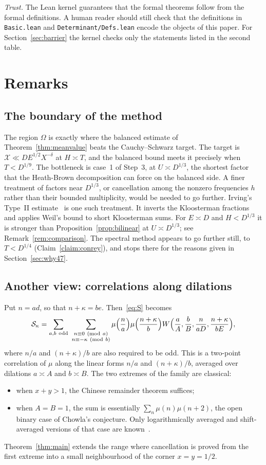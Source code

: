 \documentclass[11pt]{amsart}
\theoremstyle{definition}
\theoremstyle{remark}
\numberwithin{equation}{section}
\newcommand{\cS}{\mathcal S}
\newcommand{\cX}{\mathcal X}
\begin{document}
\emph{Trust.}  The Lean kernel guarantees that the formal theorems follow
from the formal definitions.  A human reader should still check that the
definitions in \texttt{Basic.lean} and \texttt{Determinant/Defs.lean} encode
the objects of this paper.  For Section~\ref{sec:barrier} the kernel checks
only the statements listed in the second table.

\section{Remarks}\label{sec:remarks}

\subsection{The boundary of the method}
The region $\Omega$ is exactly where the balanced estimate of
Theorem~\ref{thm:meanvalue} beats the Cauchy--Schwarz target.  The target is
$\cX\ll DE^{1/2}X^{-\delta}$ at $H\asymp T$, and the balanced bound meets it
precisely when $T<D^{1/9}$.  The bottleneck is case~1 of Step~3, at
$U\asymp D^{1/3}$, the shortest factor that the Heath-Brown decomposition
can force on the balanced side.  A finer treatment of factors near
$D^{1/3}$, or cancellation among the nonzero frequencies $h$ rather than
their bounded multiplicity, would be needed to go further.  Irving's Type~II
estimate~\cite{Irv14} is one such treatment.  It inverts the Kloosterman
fractions and applies Weil's bound to short Kloosterman sums.  For $E\asymp
D$ and $H<D^{1/3}$ it is stronger than Proposition~\ref{prop:bilinear} at
$U\asymp D^{1/3}$; see Remark~\ref{rem:comparison}.  The spectral method
appears to go further still, to $T<D^{1/4}$ (Claim~\ref{claim:conrey}), and
stops there for the reasons given in Section~\ref{sec:why47}.

\subsection{Another view: correlations along dilations}
Put $n=ad$, so that $n+\kappa=be$.  Then~\eqref{eq:S} becomes
\[
 \cS_\kappa=\sum_{a,b\ \mathrm{odd}}\
 \sum_{\substack{n\equiv0\ (\mathrm{mod}\ a)\\ n\equiv-\kappa\ (\mathrm{mod}\ b)}}
 \mu\Bigl(\frac na\Bigr)\mu\Bigl(\frac{n+\kappa}b\Bigr)
 W\Bigl(\frac aA,\frac bB,\frac n{aD},\frac{n+\kappa}{bE}\Bigr),
\]
where $n/a$ and $(n+\kappa)/b$ are also required to be odd.  This is a
two-point correlation of $\mu$ along the linear forms $n/a$ and
$(n+\kappa)/b$, averaged over dilations $a\asymp A$ and $b\asymp B$.  The
two extremes of the family are classical:
\begin{itemize}
\item when $x+y>1$, the Chinese remainder theorem suffices;
\item when $A=B=1$, the sum is essentially $\sum_n\mu(n)\mu(n+2)$, the open
binary case of Chowla's conjecture.  Only logarithmically averaged and
shift-averaged versions of that case are known~\cite{Tao16,MRT15}.
\end{itemize}
Theorem~\ref{thm:main} extends the range where cancellation is proved from
the first extreme into a small neighbourhood of the corner $x=y=1/2$.
\end{document}
